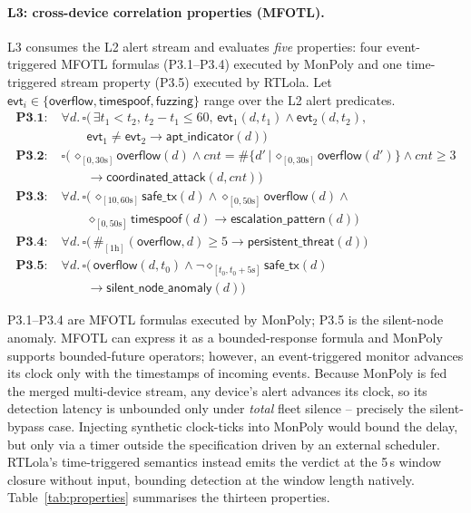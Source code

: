\documentclass[runningheads]{llncs}
\begin{document}
\paragraph{L3: cross-device correlation properties (MFOTL).}
\label{sec:spec:l3}
L3 consumes the L2 alert stream and evaluates \emph{five}
properties: four event-triggered MFOTL formulas
(P3.1--P3.4) executed by MonPoly and one time-triggered stream
property (P3.5) executed by RTLola.  Let
$\textsf{evt}_i \in \{\textsf{overflow}, \textsf{timespoof},
\textsf{fuzzing}\}$ range over the L2 alert predicates.
\begin{align*}
\textbf{P3.1}: \;& \forall d.\,\square\bigl(\,
   \exists t_1{<}t_2,\, t_2{-}t_1{\leq}60,\,
   \textsf{evt}_1(d,t_1) \wedge \textsf{evt}_2(d,t_2), \\
 & \qquad \textsf{evt}_1{\neq}\textsf{evt}_2
   \to \textsf{apt\_indicator}(d)\bigr) \\
\textbf{P3.2}: \;& \square\bigl(\,\diamond_{[0, 30\mathrm{s}]}\textsf{overflow}(d) \wedge 
   \mathit{cnt} = \#\bigl\{d' \,\big|\,
     \diamond_{[0,30\mathrm{s}]}\textsf{overflow}(d')\bigr\}
   \wedge \mathit{cnt}\geq 3 \\
 & \qquad \to \textsf{coordinated\_attack}(\mathit{d}, \mathit{cnt})\bigr) \\
\textbf{P3.3}: \;& \forall d.\,\square\bigl(\,
   \diamond_{[10,60\mathrm{s}]}\textsf{safe\_tx}(d) \wedge
   \diamond_{[0,50\mathrm{s}]}\textsf{overflow}(d) \wedge \\
 & \qquad \diamond_{[0,50\mathrm{s}]}\textsf{timespoof}(d)
   \to \textsf{escalation\_pattern}(d)\bigr) \\
\textbf{P3.4}: \;& \forall d.\,\square\bigl(\,
   \#_{[1\mathrm{h}]}(\textsf{overflow},d) \geq 5
   \to \textsf{persistent\_threat}(d)\bigr) \\
\textbf{P3.5}: \;& \forall d.\,\square\bigl(\,
   \textsf{overflow}(d,t_0) \wedge
   \neg\diamond_{[t_0, t_0+5\mathrm{s}]}\textsf{safe\_tx}(d) \\
 & \qquad \to \textsf{silent\_node\_anomaly}(d)\bigr)
\end{align*}


\noindent P3.1--P3.4 are MFOTL formulas executed by MonPoly;
P3.5 is the silent-node anomaly. MFOTL can express it as a bounded-response formula and MonPoly supports bounded-future operators; however, an event-triggered monitor advances its clock only with the timestamps of incoming events.  Because MonPoly is fed the merged multi-device stream, any device's alert advances its clock, so its detection latency is unbounded only under \emph{total} fleet silence -- precisely the silent-bypass case.  Injecting synthetic clock-ticks into MonPoly would bound the delay, but only via a timer outside the specification driven by an external scheduler.
RTLola's time-triggered semantics instead emits the verdict at the 5\,s
window closure without input, bounding detection at the window length natively.  Table~\ref{tab:properties}
summarises the thirteen properties.
\end{document}
